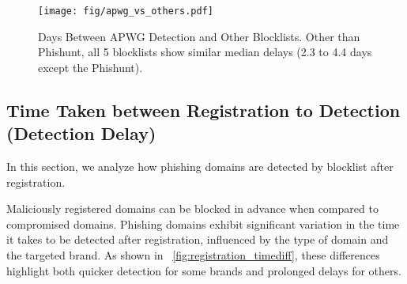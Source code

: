 

\begin{figure*}[!t]
    \centering
    \texttt{[image: fig/apwg\_vs\_others.pdf]}
    \vspace{-15px}
    \caption{Days Between APWG Detection and Other Blocklists.
    Other than Phishunt, all 5 blocklists show similar median delays (2.3 to 4.4 days except the Phishunt).
    }
    \label{fig:blocklist_compare}
    \vspace{-10px}
\end{figure*}

\subsection{Time Taken between Registration to Detection (Detection Delay)}
\label{sec:registration_detection}
In this section, we analyze how phishing domains are detected by blocklist after registration.

Maliciously registered domains can be blocked in advance when compared to compromised domains.
Phishing domains exhibit significant variation in the time it takes to be detected after registration, influenced by the type of domain and the targeted brand. As shown in ~\autoref{fig:registration_timediff}, these differences highlight both quicker detection for some brands and prolonged delays for others. 

